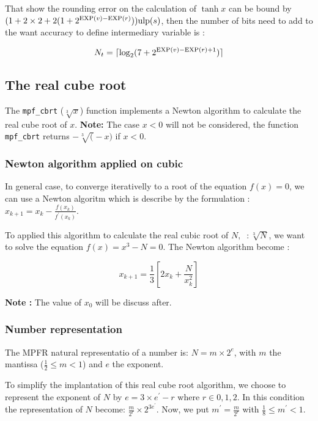\documentclass[12pt]{amsart}
\def\ulp{{\rm ulp}}
\def\exp{{\rm EXP}}
\begin{document}
That show the rounding error on the calculation of $\tanh x$ can be
bound by $(1+2 \times 2+2(1+2^{\exp(v)-\exp(r)})) \ulp(s)$, then the
number of bits need to add to the want accuracy to define intermediary
variable is :

\[
N_t=\lceil \log_2(7+2^{\exp(v)-\exp(r)+1}) \rceil
\]


\subsection{The real cube root}

The {\tt mpf\_cbrt} ($\sqrt[3]{x}$) function implements a Newton
algorithm to calculate the real cube root of $x$. {\bf Note:} The case
$x<0$ will not be considered, the function {\tt mpf\_cbrt} returns $-\sqrt[3](-x)$ if $x<0$.

\subsubsection{Newton algorithm applied on cubic}

In general case, to converge iterativelly to a
root of the equation $f(x)=0$, we can use a Newton algoritm which is describe by the formulation :
$x_{k+1}=x_k-\frac{f(x_k)}{f^{'}(x_k)}$.

To applied this algorithm to calculate the real cubic root of
$N,\;\;: \sqrt[3]{N}$, we want to solve the equation $f(x)=x^3-N=0$. The
Newton algorithm become :

\begin{equation}\label{NewtonCbrt}
x_{k+1}=\frac{1}{3}[2x_k+\frac{N}{x^2_k}]
\end{equation}

{\bf Note :} The value of $x_0$ will be discuss after.

\subsubsection{Number representation}

The MPFR natural representatio of a number is: $N=m \times 2^e$, with
$m$ the mantissa ($\frac{1}{2} \leq m < 1$) and $e$ the exponent.

To simplify the implantation of this real cube root algorithm, we
choose to represent the exponent of $N$ by $e=3 \times e^{'}-r$ where $r \in {0,1,2}$.
In this condition the representation of $N$ become:
$\frac{m}{2^r} \times 2^{3 e^{'}}$. Now, we put $m^{'}=\frac{m}{2^r}$
with $\frac{1}{8} \leq m^{'} < 1$.
\end{document}
